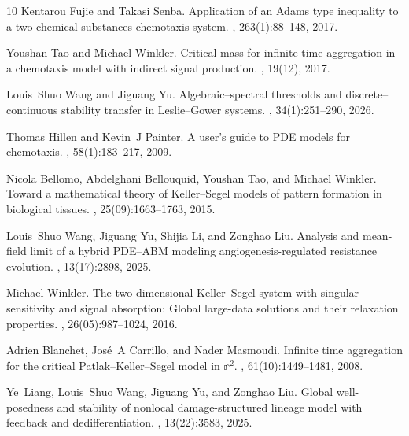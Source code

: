 \documentclass[11pt,reqno]{amsart}
\theoremstyle{definition}
\theoremstyle{remark}
\begin{document}
\begin{thebibliography}{10}
Kentarou Fujie and Takasi Senba.
\newblock Application of an {A}dams type inequality to a two-chemical substances chemotaxis system.
, 263(1):88--148, 2017.

Youshan Tao and Michael Winkler.
\newblock Critical mass for infinite-time aggregation in a chemotaxis model with indirect signal production.
, 19(12), 2017.

Louis~Shuo Wang and Jiguang Yu.
\newblock Algebraic--spectral thresholds and discrete--continuous stability transfer in {L}eslie--{G}ower systems.
, 34(1):251--290, 2026.

Thomas Hillen and Kevin~J Painter.
\newblock A user’s guide to {P}{D}{E} models for chemotaxis.
, 58(1):183--217, 2009.

Nicola Bellomo, Abdelghani Bellouquid, Youshan Tao, and Michael Winkler.
\newblock Toward a mathematical theory of {K}eller--{S}egel models of pattern formation in biological tissues.
, 25(09):1663--1763, 2015.

Louis~Shuo Wang, Jiguang Yu, Shijia Li, and Zonghao Liu.
\newblock Analysis and mean-field limit of a hybrid {P}{D}{E}--{A}{B}{M} modeling angiogenesis-regulated resistance evolution.
, 13(17):2898, 2025.

Michael Winkler.
\newblock The two-dimensional {K}eller--{S}egel system with singular sensitivity and signal absorption: {G}lobal large-data solutions and their relaxation properties.
, 26(05):987--1024, 2016.

Adrien Blanchet, Jos{\'e}~A Carrillo, and Nader Masmoudi.
\newblock Infinite time aggregation for the critical {P}atlak--{K}eller--{S}egel model in $\mathbb r^2$.
, 61(10):1449--1481, 2008.

Ye~Liang, Louis~Shuo Wang, Jiguang Yu, and Zonghao Liu.
\newblock Global well-posedness and stability of nonlocal damage-structured lineage model with feedback and dedifferentiation.
, 13(22):3583, 2025.


\end{thebibliography}
\end{document}
